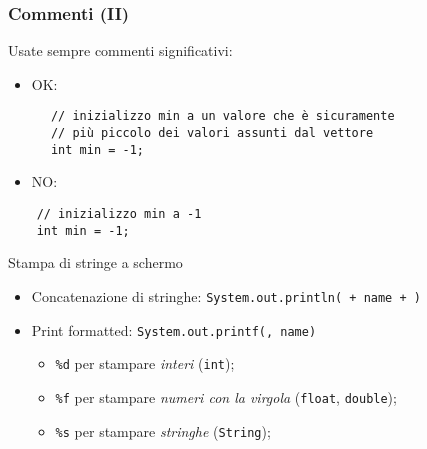 \begin{frame}[fragile]\frametitle{Commenti (II)}

  Usate sempre commenti significativi:
  \begin{itemize}
   \item {\color{green} OK}:
  \end{itemize}
  \begin{center}
    \begin{minipage}[c]{11cm}
      {\color{green!50!black}
	\begin{verbatim}
	  // inizializzo min a un valore che è sicuramente 
	  // più piccolo dei valori assunti dal vettore
	  int min = -1;      
	\end{verbatim} 
      }
    \end{minipage}  
  \end{center}

  \begin{itemize}
   \item {\color{red} NO}:
  \end{itemize}
  {\color{red!80!black}
  \begin{center}
    \begin{minipage}[c]{11cm}
      \begin{verbatim}
	// inizializzo min a -1
	int min = -1;
      \end{verbatim}
    \end{minipage}  
  \end{center}
  }

\end{frame}

\begin{frame}{Stampa di stringe a schermo}
  \begin{itemize}
    \item Concatenazione di stringhe: \newline
	  \texttt{System.out.println( + name + )}
    \item Print formatted: \newline
	  \texttt{System.out.printf(, name)}
      \begin{itemize}
	\item \texttt{\%d} per stampare \emph{interi} (\texttt{int});
	\item \texttt{\%f} per stampare \emph{numeri con la virgola} (\texttt{float}, \texttt{double});
	\item \texttt{\%s} per stampare \emph{stringhe} (\texttt{String});
      \end{itemize}
  \end{itemize}
 
\end{frame}
